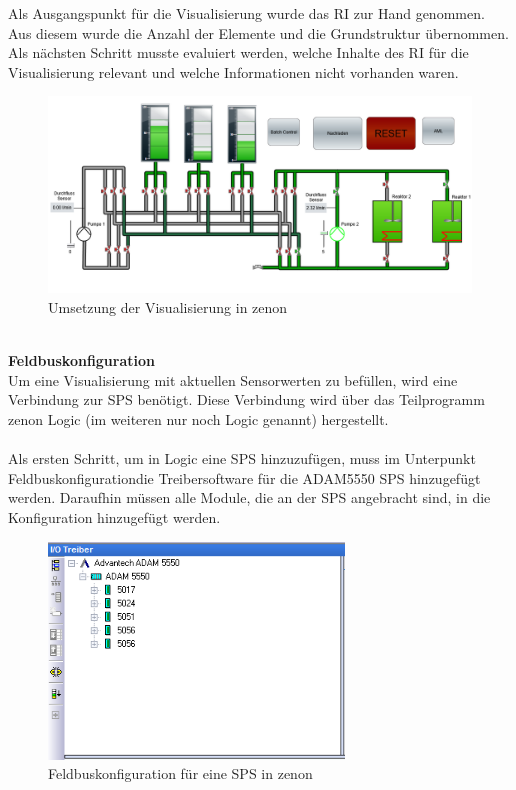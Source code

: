Als Ausgangspunkt für die Visualisierung wurde das \ac{RI} zur Hand genommen. Aus diesem wurde die Anzahl der Elemente und die Grundstruktur übernommen. Als nächsten Schritt musste evaluiert werden, welche Inhalte des \ac{RI} für die Visualisierung relevant und welche Informationen nicht vorhanden waren.\\
\begin{figure}[hbt!]
  \centering
  \includegraphics[width=1\textwidth]{graphics/implementation/Visualisierung}
  \caption{Umsetzung der Visualisierung in zenon}
\end{figure}
\\
\newpage
\textbf{Feldbuskonfiguration}\\
Um eine Visualisierung mit aktuellen Sensorwerten zu befüllen, wird eine Verbindung zur \ac{SPS} benötigt. Diese Verbindung wird über das Teilprogramm zenon Logic (im weiteren nur noch Logic genannt) hergestellt.\\
\\
Als ersten Schritt, um in Logic eine \ac{SPS} hinzuzufügen, muss im Unterpunkt \glqq Feldbuskonfiguration\grqq\space die Treibersoftware für die ADAM5550 \ac{SPS} hinzugefügt werden. Daraufhin müssen alle Module, die an der \ac{SPS} angebracht sind, in die Konfiguration hinzugefügt werden.\\
\begin{figure}[h!]
  \centering
  \includegraphics[width=0.7\textwidth]{graphics/implementation/Feldbuskonfiguration}
  \caption{Feldbuskonfiguration für eine \ac{SPS} in zenon}
\end{figure}
